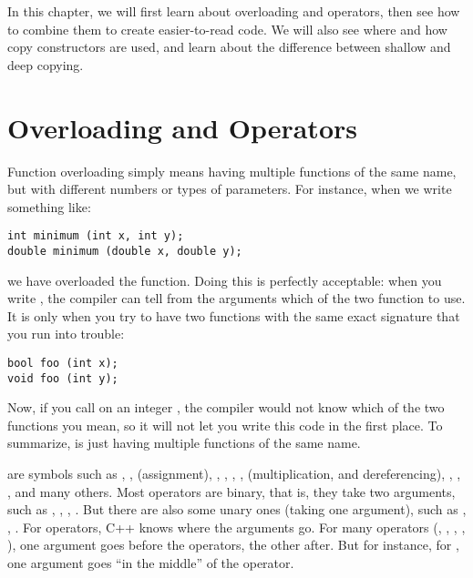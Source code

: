 In this chapter, we will first learn about overloading and operators,
then see how to combine them to create easier-to-read code.
We will also see where and how copy constructors are used,
and learn about the difference between shallow and deep copying.

\section{Overloading and Operators}
Function overloading simply means having multiple functions of the
same name, but with different numbers or types of parameters.
For instance, when we write something like:
\begin{verbatim}
int minimum (int x, int y);
double minimum (double x, double y);
\end{verbatim}
we have overloaded the  function.
Doing this is perfectly acceptable:
when you write ,
the compiler can tell from the arguments which of the two function to use.
It is only when you try to have two functions with the same exact
signature that you run into trouble:
\begin{verbatim}
bool foo (int x);
void foo (int y);
\end{verbatim}
Now, if you call  on an integer ,
the compiler would not know which of the two functions you mean,
so it will not let you write this code in the first place. 
To summarize,  is just having multiple functions of the same name.

 are symbols such as 
\code{==}, \code{!=}, \code{=} (assignment), \code{<=}, \code{+},
\code{-}, \code{++}, \code{*} (multiplication, and dereferencing), \code{[]}, 
\code{<<}, \code{>>}, and many others.
Most operators are binary, that is, they take two arguments, such as
, , , .
But there are also some unary ones (taking one argument),
such as , , .
For operators, C++ knows where the arguments go. For many operators
(\code{=}, \code{==}, \code{<=}, \code{+}, \code{<<}),
one argument goes before the operators, the other after.
But for instance, for , one argument goes ``in the middle''
of the operator.

